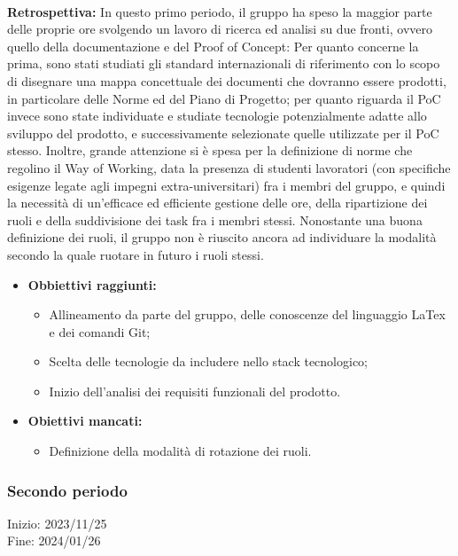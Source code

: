 \paragraph{}
\textbf{Retrospettiva:}
In questo primo periodo, il gruppo ha speso la maggior parte delle proprie ore svolgendo un lavoro di ricerca ed analisi
su due fronti, ovvero quello della documentazione e del Proof of Concept: Per quanto concerne la prima, sono stati studiati gli standard internazionali di riferimento
con lo scopo di disegnare una mappa concettuale dei documenti che dovranno essere prodotti, in particolare delle Norme ed del Piano di Progetto; per quanto
riguarda il PoC invece sono state individuate e studiate tecnologie potenzialmente adatte allo sviluppo del prodotto, e successivamente selezionate quelle utilizzate per il PoC stesso. Inoltre, grande attenzione si è spesa per la definizione di norme che regolino il Way of Working, data la presenza di studenti lavoratori (con
specifiche esigenze legate agli impegni extra-universitari) fra i membri del gruppo, e quindi la necessità di un'efficace ed efficiente gestione delle ore, della ripartizione dei ruoli
e della suddivisione dei task fra i membri stessi. Nonostante una buona definizione dei ruoli, il gruppo non è riuscito ancora ad individuare la modalità secondo la quale
ruotare in futuro i ruoli stessi.
\begin{itemize}
    \item \textbf{Obbiettivi raggiunti:}
    \begin{itemize}
        \item Allineamento da parte del gruppo, delle conoscenze del linguaggio LaTex e dei comandi Git;
        \item Scelta delle tecnologie da includere nello stack tecnologico;
        \item Inizio dell'analisi dei requisiti funzionali del prodotto.
    \end{itemize}
    \item \textbf{Obiettivi mancati:}
    \begin{itemize}
        \item Definizione della modalità di rotazione dei ruoli.
    \end{itemize}
\end{itemize}

\subsubsection{Secondo periodo}
Inizio: 2023/11/25 \\
Fine: 2024/01/26 \\


